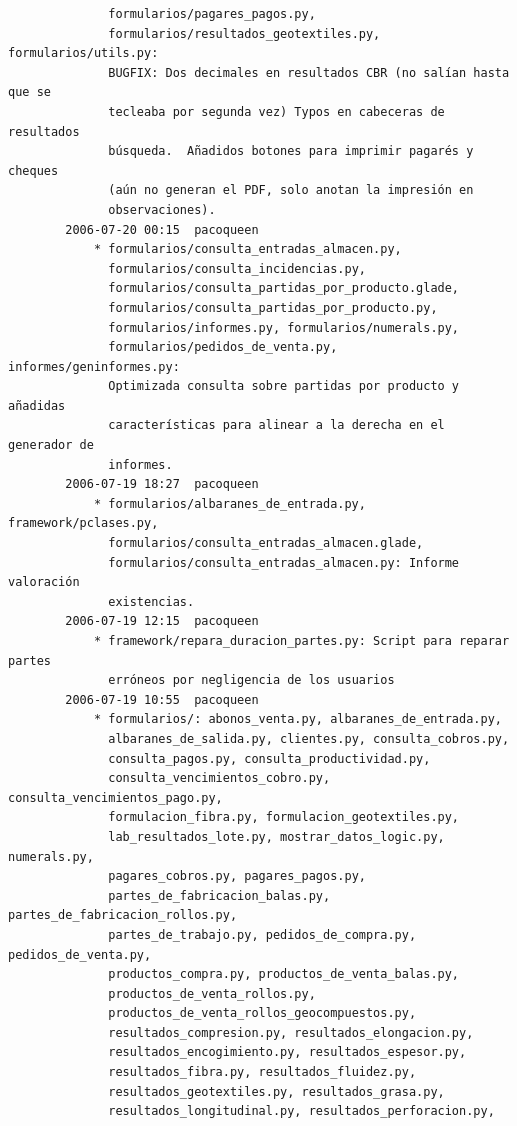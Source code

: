 \documentclass[a4paper]{article}
\begin{document}
\begin{verbatim}
              formularios/pagares_pagos.py,
              formularios/resultados_geotextiles.py, formularios/utils.py:
              BUGFIX: Dos decimales en resultados CBR (no salían hasta que se
              tecleaba por segunda vez) Typos en cabeceras de resultados
              búsqueda.  Añadidos botones para imprimir pagarés y cheques
              (aún no generan el PDF, solo anotan la impresión en
              observaciones).
        2006-07-20 00:15  pacoqueen
            * formularios/consulta_entradas_almacen.py,
              formularios/consulta_incidencias.py,
              formularios/consulta_partidas_por_producto.glade,
              formularios/consulta_partidas_por_producto.py,
              formularios/informes.py, formularios/numerals.py,
              formularios/pedidos_de_venta.py, informes/geninformes.py:
              Optimizada consulta sobre partidas por producto y añadidas
              características para alinear a la derecha en el generador de
              informes.
        2006-07-19 18:27  pacoqueen
            * formularios/albaranes_de_entrada.py, framework/pclases.py,
              formularios/consulta_entradas_almacen.glade,
              formularios/consulta_entradas_almacen.py: Informe valoración
              existencias.
        2006-07-19 12:15  pacoqueen
            * framework/repara_duracion_partes.py: Script para reparar partes
              erróneos por negligencia de los usuarios
        2006-07-19 10:55  pacoqueen
            * formularios/: abonos_venta.py, albaranes_de_entrada.py,
              albaranes_de_salida.py, clientes.py, consulta_cobros.py,
              consulta_pagos.py, consulta_productividad.py,
              consulta_vencimientos_cobro.py, consulta_vencimientos_pago.py,
              formulacion_fibra.py, formulacion_geotextiles.py,
              lab_resultados_lote.py, mostrar_datos_logic.py, numerals.py,
              pagares_cobros.py, pagares_pagos.py,
              partes_de_fabricacion_balas.py, partes_de_fabricacion_rollos.py,
              partes_de_trabajo.py, pedidos_de_compra.py, pedidos_de_venta.py,
              productos_compra.py, productos_de_venta_balas.py,
              productos_de_venta_rollos.py,
              productos_de_venta_rollos_geocompuestos.py,
              resultados_compresion.py, resultados_elongacion.py,
              resultados_encogimiento.py, resultados_espesor.py,
              resultados_fibra.py, resultados_fluidez.py,
              resultados_geotextiles.py, resultados_grasa.py,
              resultados_longitudinal.py, resultados_perforacion.py,

\end{verbatim}
\end{document}
